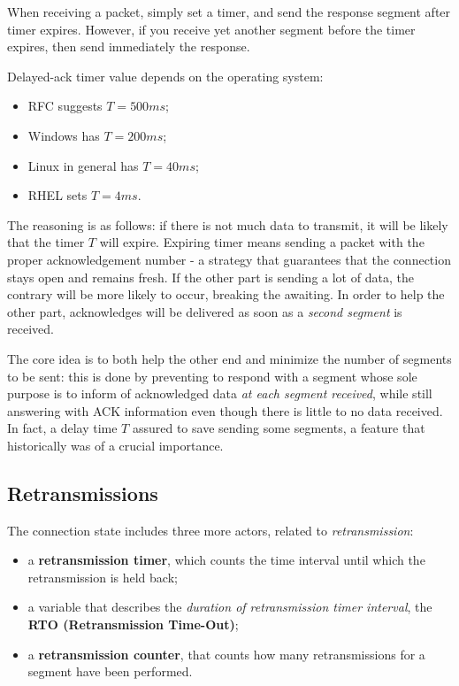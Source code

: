 \documentclass[10pt]{extbook}
\begin{document}
When receiving a packet, simply set a timer, and send the response segment
after timer expires. However, if you receive yet another segment before the
timer expires, then send immediately the response.

Delayed-ack timer value depends on the operating system:

\begin{itemize}
    \item RFC suggests $T = 500ms$;
    \item Windows has $T = 200ms$;
    \item Linux in general has $T = 40ms$;
    \item RHEL sets $T = 4ms$.
\end{itemize}

The reasoning is as follows: if there is not much data to transmit, it will be
likely that the timer $T$ will expire. Expiring timer means sending a packet
with the proper acknowledgement number \-- a strategy that guarantees that the
connection stays open and remains fresh. If the other part is sending a lot of
data, the contrary will be more likely to occur, breaking the awaiting. In
order to help the other part, acknowledges will be delivered as soon as a
\emph{second segment} is received. 

The core idea is to both help the other end and
minimize the number of segments to be sent: this is done by preventing to
respond with a segment whose sole purpose is to inform of acknowledged data
\emph{at each segment received}, while still answering with ACK information
even though there is little to no data received. In fact, a delay time $T$
assured to save sending some segments, a feature that historically was of a
crucial importance.

\subsection{Retransmissions}

The connection state includes three more actors, related to
\emph{retransmission}:

\begin{itemize}
    \item a \textbf{retransmission timer}, which counts the time interval until
        which the retransmission is held back;
	\item a variable that describes the \emph{duration of retransmission
        timer interval}, the \textbf{RTO (Retransmission Time-Out)};
    \item a \textbf{retransmission counter}, that counts how many
        retransmissions for a segment have been performed.
\end{itemize}
\end{document}
